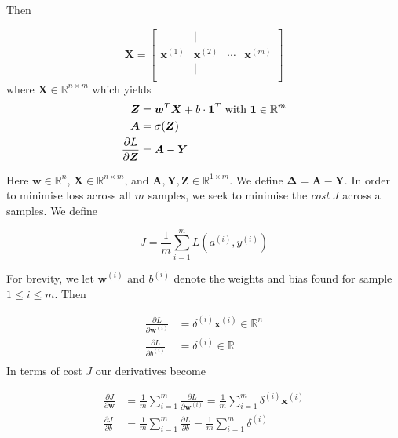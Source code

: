 \documentclass[a4paper]{article}
\begin{document}
Then


$$
\bm X = 
\left[
\begin{array}{cccc}
| & | &        & | \\
\bm{x}^{(1)} & \bm{x}^{(2)} & \cdots & \bm{x}^{(m)} \\
| & | &        & | \\
\end{array}
\right]
$$
where $\bm X \in \mathbb{R}^{n \times m}$ which yields
\begin{align}
\bm Z &= \bm w ^T \bm X + b \cdot \bold 1 ^T \ \text{with} \ \bold 1 \in \mathbb{R}^m \\
\bm A &= \sigma(\bm Z) \\
\frac{\partial L}{\partial \bm Z} &= \bm A - \bm Y 
\end{align}

Here $\bm w \in \mathbb{R}^{n}$, $\bm X \in \mathbb{R}^{n \times m}$, and $\bm A, \bm Y, \bm Z \in \mathbb{R}^{1 \times m}$. We define $\bm\Delta = \bm A - \bm Y$. In order to minimise loss across all $m$ samples, we seek to minimise the \textit{cost} $J$ across all samples. We define

\begin{equation}
J = \frac{1}{m}\displaystyle \sum _{i=1} ^m L(a^{(i)}, y^{(i)})
\end{equation}

For brevity, we let $\bm w ^{(i)}$ and $b^{(i)}$ denote the weights and bias found for sample $1 \le i \le m$. Then



\begin{align}
\frac{\partial L}{\partial \bm w ^{(i)}} &= \delta ^{(i)}\bm x^{(i)} \in \mathbb{R}^n \\
\frac{\partial L}{\partial b^{(i)}} &= \delta ^{(i)} \in \mathbb{R} \\
\end{align}
In terms of cost $J$ our derivatives become

\begin{align}
\frac{\partial J}{\partial \bm w} &= \frac{1}{m} \displaystyle \sum ^m _{i=1} \frac{\partial L}{\partial \bm w ^{(i)}} = \frac{1}{m} \displaystyle \sum ^m _{i=1} \delta^{(i)}\bm x^{(i)}\\
\frac{\partial J}{\partial b} &= \frac{1}{m} \displaystyle \sum ^m _{i=1} \frac{\partial L}{\partial b} = \frac{1}{m} \displaystyle \sum ^m _{i=1} \delta^{(i)}\\
\end{align}
\end{document}
